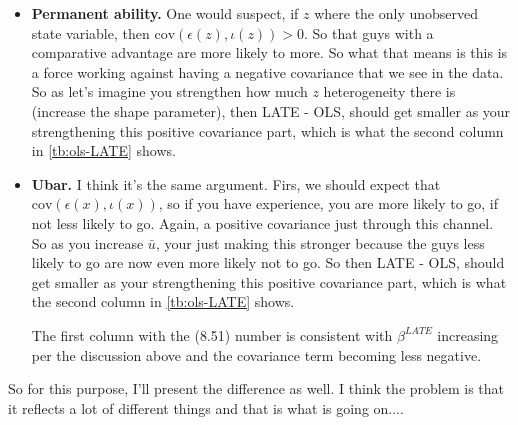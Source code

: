 \documentclass[pdftex,11pt]{article}
\begin{document}
\begin{itemize}
\item \textbf{Permanent ability.} One would suspect, if $z$ where the only unobserved state variable, then  $\mathrm{cov}( \epsilon(z), \iota(z)) > 0$. So that guys with a comparative advantage are more likely to more. So what that means is this is a force working against having a negative covariance that we see in the data. So as let's imagine you strengthen how much $z$ heterogeneity there is (increase the shape parameter), then LATE - OLS, should get smaller as your strengthening this positive covariance part, which is what the second column in \ref{tb:ols-LATE} shows.
    
\item \textbf{Ubar.} I think it's the same argument. Firs, we should expect that $\mathrm{cov}( \epsilon(x), \iota(x))$, so if you have experience, you are more likely to go, if not less likely to go. Again, a positive covariance just through this channel. So as you increase $\bar u$, your just making this stronger because the guys less likely to go are now even more likely not to go. So then LATE - OLS, should get smaller as your strengthening this positive covariance part, which is what the second column in \ref{tb:ols-LATE} shows.
    
    The first column with the (8.51) number is consistent with $\beta^{LATE}$ increasing per the discussion above and the covariance term becoming less negative. 

\end{itemize}

So for this purpose, I'll present the difference as well. I think the problem is that it reflects a lot of different things and that is what is going on.... \\
\end{document}
